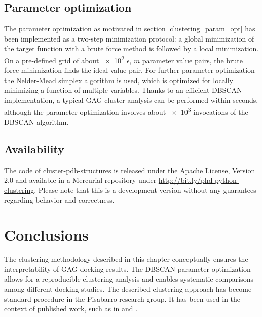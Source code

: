 \subsection{Parameter optimization}

The parameter optimization as motivated in section \ref{clustering_param_opt}
has been implemented as a two-step minimization protocol: a global minimization
of the target function with a brute force method is followed by a local
minimization. On a pre-defined grid of about \num{e2} $\epsilon$, $m$ parameter
value pairs, the brute force minimization finds the ideal value pair. For
further parameter optimization the Nelder-Mead simplex algorithm
\cite{nelder_mead} is used, which is optimized for locally minimizing a function
of multiple variables. Thanks to an efficient DBSCAN implementation, a typical
GAG cluster analysis can be performed within seconds, although the parameter
optimization involves about \num{e3} invocations of the DBSCAN algorithm.


\subsection{Availability}

The code of cluster-pdb-structures is released under the Apache License, Version
2.0 \cite{apache_license_2} and available in a Mercurial repository under
\url{http://bit.ly/phd-python-clustering}. Please note that this is a
development version without any guarantees regarding behavior and correctness.


\section{Conclusions}

The clustering methodology described in this chapter conceptually ensures the
interpretability of GAG docking results. The DBSCAN parameter optimization
allows for a reproducible clustering analysis and enables systematic comparisons
among different docking studies. The described clustering approach has become
standard procedure in the Pisabarro research group. It has been used in the
context of published work, such as in \cite{franz_cathepsin_2013}
and \cite{dmd_samsonov_gehrcke_2014}.




